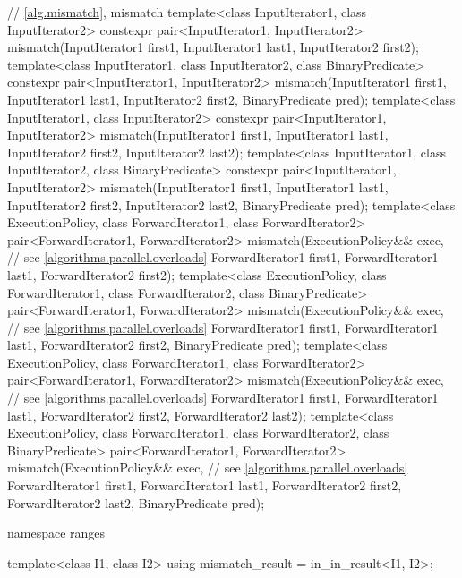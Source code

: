 \begin{codeblock}
{  // \ref{alg.mismatch}, mismatch
  template<class InputIterator1, class InputIterator2>
    constexpr pair<InputIterator1, InputIterator2>
      mismatch(InputIterator1 first1, InputIterator1 last1,
               InputIterator2 first2);
  template<class InputIterator1, class InputIterator2, class BinaryPredicate>
    constexpr pair<InputIterator1, InputIterator2>
      mismatch(InputIterator1 first1, InputIterator1 last1,
               InputIterator2 first2, BinaryPredicate pred);
  template<class InputIterator1, class InputIterator2>
    constexpr pair<InputIterator1, InputIterator2>
      mismatch(InputIterator1 first1, InputIterator1 last1,
               InputIterator2 first2, InputIterator2 last2);
  template<class InputIterator1, class InputIterator2, class BinaryPredicate>
    constexpr pair<InputIterator1, InputIterator2>
      mismatch(InputIterator1 first1, InputIterator1 last1,
               InputIterator2 first2, InputIterator2 last2,
               BinaryPredicate pred);
  template<class ExecutionPolicy, class ForwardIterator1, class ForwardIterator2>
    pair<ForwardIterator1, ForwardIterator2>
      mismatch(ExecutionPolicy&& exec,                          // see \ref{algorithms.parallel.overloads}
               ForwardIterator1 first1, ForwardIterator1 last1,
               ForwardIterator2 first2);
  template<class ExecutionPolicy, class ForwardIterator1, class ForwardIterator2,
           class BinaryPredicate>
    pair<ForwardIterator1, ForwardIterator2>
      mismatch(ExecutionPolicy&& exec,                          // see \ref{algorithms.parallel.overloads}
               ForwardIterator1 first1, ForwardIterator1 last1,
               ForwardIterator2 first2, BinaryPredicate pred);
  template<class ExecutionPolicy, class ForwardIterator1, class ForwardIterator2>
    pair<ForwardIterator1, ForwardIterator2>
      mismatch(ExecutionPolicy&& exec,                          // see \ref{algorithms.parallel.overloads}
               ForwardIterator1 first1, ForwardIterator1 last1,
               ForwardIterator2 first2, ForwardIterator2 last2);
  template<class ExecutionPolicy, class ForwardIterator1, class ForwardIterator2,
           class BinaryPredicate>
    pair<ForwardIterator1, ForwardIterator2>
      mismatch(ExecutionPolicy&& exec,                          // see \ref{algorithms.parallel.overloads}
               ForwardIterator1 first1, ForwardIterator1 last1,
               ForwardIterator2 first2, ForwardIterator2 last2,
               BinaryPredicate pred);

  namespace ranges {
    template<class I1, class I2>
      using mismatch_result = in_in_result<I1, I2>;

}}
\end{codeblock}
